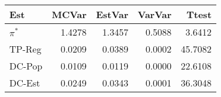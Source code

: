 
\begin{tabular}{lrrrr}
\toprule
Est & MCVar & EstVar & VarVar & Ttest\\
\midrule
$\pi^*$ & 1.4278 & 1.3457 & 0.5088 & 3.6412\\
TP-Reg & 0.0209 & 0.0389 & 0.0002 & 45.7082\\
DC-Pop & 0.0109 & 0.0119 & 0.0000 & 22.6108\\
DC-Est & 0.0249 & 0.0343 & 0.0001 & 36.3048\\
\bottomrule
\end{tabular}